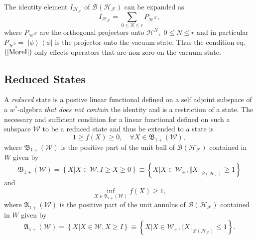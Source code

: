 \documentclass[aps,preprint,amsfonts,amssymb,showpacs,showkeys]{revtex4}%
\begin{document}
The identity element $I_{\mathcal{H}_{\mathcal{F}}}$ of $\mathcal{B}\left(
\mathcal{H}_{\mathcal{F}}\right)  $ can be expanded as
\begin{equation}
I_{\mathcal{H}_{\mathcal{F}}}=\sum_{0\leq N\leq r}P_{\mathcal{H}^{N}},
\end{equation}
where $P_{\mathcal{H}^{N}}$ are the orthogonal projectors onto $\mathcal{H}%
^{N},$ $0\leq N\leq r$ and in particular $P_{\mathcal{H}^{0}}=$ $\left\vert
\phi\right\rangle \left\langle \phi\right\vert $ is the projector onto the
vacuum state. Thus the condition eq.$\left(  \ref{MoreI}\right)  $ only
effects operators that are non zero on the vacuum state.

\subsection{Reduced States \label{Reduced States}}

A \emph{reduced} state is a postive linear functional defined on a self
adjoint subspace of a $w^{\ast}$-algebra \emph{that does not contain} the
identity and is a restriction of a state. The necessary and sufficient
condition \cite{Segal} for a linear functional defined on such a subspace
$\mathcal{W}$ to be a reduced state and thus be extended to a state is
\begin{equation}
1\geq f\left(  X\right)  \geq0,\quad\forall X\in\mathfrak{B}_{1+}\left(
\mathcal{W}\right)  ,
\end{equation}
where $\mathfrak{B}_{1+}\left(  \mathcal{W}\right)  $ is the positive part of
the unit ball of $\mathcal{B}\left(  \mathcal{H}_{\mathcal{F}}\right)  $
contained in $W$ given by%
\begin{equation}
\mathfrak{B}_{1+}\left(  \mathcal{W}\right)  =\left\{  \left.  X\right\vert
X\in\mathcal{W},I\geq X\geq0\right\}  \equiv\left\{  \left.  X\right\vert
X\in\mathcal{W}_{+},\left\Vert X\right\Vert _{\mathcal{B}\left(
\mathcal{H}_{\mathcal{F}}\right)  }\geq1\right\}  \label{BallCond}%
\end{equation}
and
\begin{equation}
\inf_{X\in\mathfrak{A}_{1+}\left(  \mathcal{W}\right)  }f\left(  X\right)
\geq1,
\end{equation}
where $\mathfrak{A}_{1+}\left(  \mathcal{W}\right)  $ is the positive part of
the unit annulus of $\mathcal{B}\left(  \mathcal{H}_{\mathcal{F}}\right)  $
contained in $W$ given by
\begin{equation}
\mathfrak{A}_{1+}\left(  \mathcal{W}\right)  =\left\{  \left.  X\right\vert
X\in\mathcal{W},X\geq I\right\}  \equiv\left\{  \left.  X\right\vert
X\in\mathcal{W}_{+},\left\Vert X\right\Vert _{\mathcal{B}\left(
\mathcal{H}_{\mathcal{F}}\right)  }\leq1\right\}  . \label{AnnCon}%
\end{equation}
\end{document}
